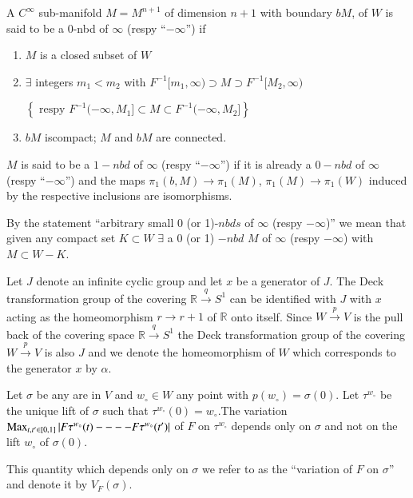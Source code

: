 \begin{definition} %
A $C^\infty$ sub-manifold $M = M^{n+1}$ of dimension $n+1$ with
boundary $b M$, of $W$ is said to be a 0-nbd of $\infty$ (respy
``$-\infty$'') if  
\begin{enumerate}[(1)]
\item $M$ is a closed subset of $W$

\item $\exists$ integers $m_1 < m_2$ with $F^{-1}[ m_1, \infty )
  \supset M \supset F^{-1}[M_2, \infty)$ 

$\left\{ \text{ respy } F^{-1}(
    -\infty, M_1] \subset M \subset F^{-1}(-\infty, M_2]\right\}$ 

\item  $b M$ is\pageoriginale compact; $M$ and $b M$ are connected.
\end{enumerate}

$M$ is said to be a $1-nbd$ of $\infty$ (respy ``$-\infty$'') if it
is already a $0- nbd$ of $\infty$ (respy ``$-\infty$'') and the maps
$\pi_1 (b, M) \to \pi_1 (M)$, $\pi_1(M) \to \pi_1(W)$ induced by the
respective inclusions are isomorphisms. 
\end{definition}

\begin{definition}%
By the statement  ``arbitrary small 0 (or 1)-$nbds$ of $\infty$
(respy $-\infty$)'' we mean that given any compact set $K \subset W$
$\exists$ a 0 (or 1) $-nbd$ $M$ of $\infty$  (respy $-\infty$) with $M
\subset W - K$. 

Let $J$ denote an infinite cyclic group and let $x$ be a generator of
$J$. The Deck transformation group of the covering $\mathbb{R}
\xrightarrow{q} S^1$ can be identified with $J$ with $x$ acting as the
homeomorphism $r \to r + 1$ of $\mathbb{R}$ onto itself. Since $W
\xrightarrow{p} V$ is the pull back of the covering space $\mathbb{R}
\xrightarrow{q} S^1$ the Deck transformation group of the covering $W
\xrightarrow{p} V$ is also $J$ and we denote the homeomorphism of $W$
which corresponds to the generator $x$ by $\alpha$. 
\end{definition}

\setcounter{lemma}{2}
\begin{lemma}\label{chap2:lem2.3}%
Let $\sigma$ be any are in $V$  and $w_\circ \in W$ any point with $
p(w_\circ) = \sigma (0)$.  Let $\tau^{w_\circ}$ be the unique lift of
$\sigma$ such that $\tau^{w_\circ}(0) = w_\circ$.The variation $\operatorname{Max}_{t, t'
  \in [0, 1]} | F \tau^{w_\circ}(t) ---- F \tau^{w_\circ} (t')|$ of
$F$ on $\tau^{w_\circ}$ 
depends only on $\sigma$ and not on the lift $w_\circ$ of $\sigma (0)$. 

This quantity which depends only on $\sigma$  we refer to as the
``variation of $F$ on $\sigma$'' and denote it by $V_F (\sigma)$. 
\end{lemma}

